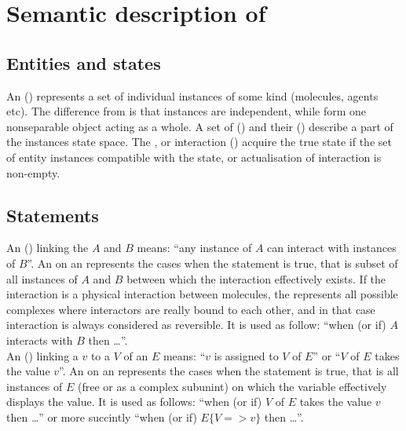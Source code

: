 \section{Semantic description of \ERs}


\subsection{Entities and states}

An  () represents a set of individual instances of some kind (molecules, agents etc). The difference from \SBGNPDLone {} is that  instances are independent, while  form one nonseparable object acting as a whole. A set of  () and their  () describe a part of the  instances state space. The  , or  interaction  () acquire the true state if the set of entity instances compatible with the  state, or  actualisation of interaction is non-empty. 

 
\subsection{Statements}

An  () linking the  $A$ and $B$ means: ``any instance of $A$ can interact with instances of $B$''. An  on an  represents the cases when the statement is true, that is subset of all instances of $A$ and $B$ between which the interaction effectively exists. If the interaction is a physical interaction between molecules, the  represents all possible complexes where interactors are really bound to each other, and in that case interaction is always considered as reversible. It is used as follow: ``when (or if) $A$ interacts with $B$ then \ldots''.\\[\baselineskip]

\noindent
An  () linking a  $v$ to a  $V$ of an  $E$ means: ``$v$ is assigned to $V$ of $E$'' or ``$V$ of $E$ takes the value $v$''. An  on an  represents the cases when the statement is true, that is all instances of $E$ (free or as a complex subunint) on which the variable effectively displays the value. It is used as follows: ``when (or if) $V$ of $E$ takes the value $v$ then \ldots'' or more succintly ``when (or if) $E\{V => v\}$ then \ldots''.\\[\baselineskip]

